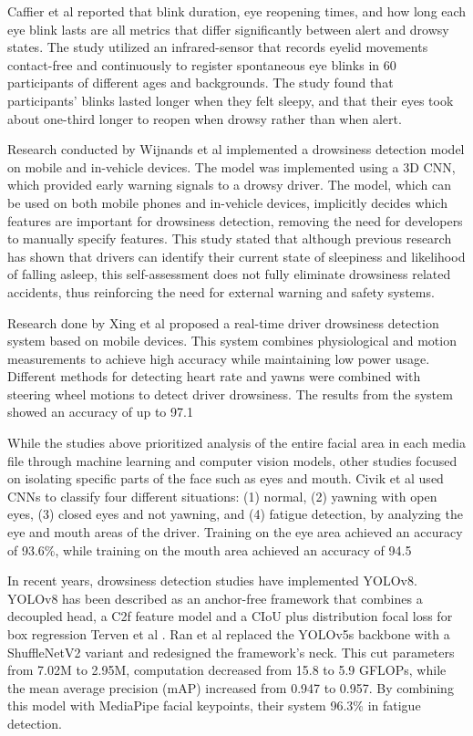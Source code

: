 \documentclass[pdflatex,sn-mathphys-num]{sn-jnl}
\theoremstyle{thmstyleone}%
\theoremstyle{thmstyletwo}%
\theoremstyle{thmstylethree}%
\begin{document}
	Caffier et al  \cite{bib14} reported that blink duration, eye reopening times, and how long each eye blink lasts are all metrics that differ significantly between alert and drowsy states. The study utilized an infrared-sensor that records eyelid movements contact-free and continuously to register spontaneous eye blinks in 60 participants of different ages and backgrounds. The study found that participants' blinks lasted longer when they felt sleepy, and that their eyes took about one-third longer to reopen when drowsy rather than when alert.
	
	Research conducted by Wijnands et al  \cite{bib15} implemented a drowsiness detection model on mobile and in-vehicle devices. The model was implemented using a 3D CNN, which provided early warning signals to a drowsy driver. The model, which can be used on both mobile phones and in-vehicle devices, implicitly decides which features are important for drowsiness detection, removing the need for developers to manually specify features. This study stated that although previous research has shown that drivers can identify their current state of sleepiness and likelihood of falling asleep, this self-assessment does not fully eliminate drowsiness related accidents, thus reinforcing the need for external warning and safety systems.
	
	Research done by Xing et al  \cite{bib16} proposed a real-time driver drowsiness detection system based on mobile devices. This system combines physiological and motion measurements to achieve high accuracy while maintaining low power usage. Different methods for detecting heart rate and yawns were combined with steering wheel motions to detect driver drowsiness. The results from the system showed an accuracy of up to 97.1%
	
	While the studies above prioritized analysis of the entire facial area in each media file through machine learning and computer vision models, other studies focused on isolating specific parts of the face such as eyes and mouth. Civik et al  \cite{bib17} used CNNs to classify four different situations: (1) normal, (2) yawning with open eyes, (3) closed eyes and not yawning, and (4) fatigue detection, by analyzing the eye and mouth areas of the driver. Training on the eye area achieved an accuracy of 93.6\%, while training on the mouth area achieved an accuracy of 94.5%
	
	In recent years, drowsiness detection studies have implemented YOLOv8. YOLOv8 has been described as an anchor-free framework that combines a decoupled head, a C2f feature model and a CIoU plus distribution focal loss for box regression Terven et al \cite{bib18}. Ran et al  \cite{bib19} replaced the YOLOv5s backbone with a ShuffleNetV2 variant and redesigned the framework’s neck. This cut parameters from 7.02M to 2.95M, computation decreased from 15.8 to 5.9 GFLOPs, while the mean average precision (mAP) increased from 0.947 to 0.957. By combining this model with MediaPipe facial keypoints, their system 96.3\% in fatigue detection.
	
\end{document}
